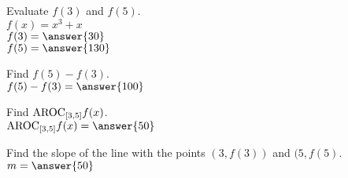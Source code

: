 \documentclass{ximera}
\author{David Kish}
\begin{document}
\begin{exercise}
Evaluate $f(3)$ and $f(5)$.\\
$f(x)= x^3+x$\\
$f(3)=\answer{30}$\\
$f(5)=\answer{130}$
\end{exercise}
\begin{exercise}
Find $f(5)-f(3)$.\\
$f(5)-f(3)=\answer{100}$
\end{exercise}
\begin{exercise}
Find $\mathrm{AROC}_{[3, 5]} f(x)$.\\
$\av_{[3, 5]} f(x) = \answer{50}$
\end{exercise}
\begin{exercise}
Find the slope of the line with the points $(3, f(3))$ and $(5, f(5)$.\\
$m=\answer{50}$
\end{exercise}
\end{document}
